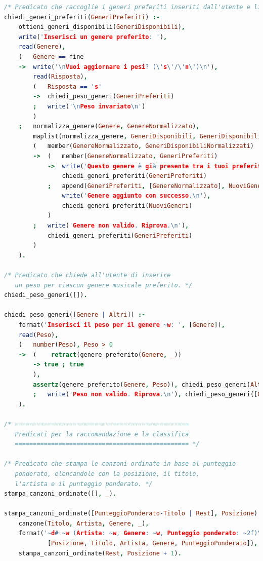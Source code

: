 \documentclass[a4paper,11pt]{article}
\begin{document}
\begin{lstlisting}[language=Prolog]
/* Predicato che raccoglie i generi preferiti inseriti dall'utente e li aggiunge alla lista di preferiti. */
chiedi_generi_preferiti(GeneriPreferiti) :- 
    ottieni_generi_disponibili(GeneriDisponibili),
    write('Inserisci un genere preferito: '),
    read(Genere),
    (   Genere == fine
    ->  write('\nVuoi aggiornare i pesi? (\'s\'/\'n\')\n'),
        read(Risposta),
        (   Risposta == 's'
        ->  chiedi_peso_generi(GeneriPreferiti)
        ;   write('\nPeso invariato\n')
        )
    ;   normalizza_genere(Genere, GenereNormalizzato),
        maplist(normalizza_genere, GeneriDisponibili, GeneriDisponibiliNormalizzati),
        (   member(GenereNormalizzato, GeneriDisponibiliNormalizzati)
        ->  (   member(GenereNormalizzato, GeneriPreferiti)
            ->  write('Questo genere è già presente tra i tuoi preferiti.\n'),
                chiedi_generi_preferiti(GeneriPreferiti)
            ;   append(GeneriPreferiti, [GenereNormalizzato], NuoviGeneri),
                write('Genere aggiunto con successo.\n'),
                chiedi_generi_preferiti(NuoviGeneri)
            )
        ;   write('Genere non valido. Riprova.\n'),
            chiedi_generi_preferiti(GeneriPreferiti)
        )
    ).

/* Predicato che chiede all'utente di inserire
   un peso per ciascun genere musicale preferito. */
chiedi_peso_generi([]).

chiedi_peso_generi([Genere | Altri]) :- 
    format('Inserisci il peso per il genere ~w: ', [Genere]),
    read(Peso),
    (   number(Peso), Peso > 0
    ->  (    retract(genere_preferito(Genere, _))
        -> true ; true
        ),
        assertz(genere_preferito(Genere, Peso)), chiedi_peso_generi(Altri)
        ;   write('Peso non valido. Riprova.\n'), chiedi_peso_generi([Genere | Altri])
    ).
    
/* ================================================
   Predicati per la raccomandazione e la classifica
   ================================================ */

/* Predicato che stampa le canzoni ordinate in base al punteggio
   ponderato, elencandole con la posizione, il titolo,
   l'artista e il punteggio ponderato. */
stampa_canzoni_ordinate([], _).

stampa_canzoni_ordinate([PunteggioPonderato-Titolo | Rest], Posizione) :- 
    canzone(Titolo, Artista, Genere, _),
    format('~d# ~w (Artista: ~w, Genere: ~w, Punteggio ponderato: ~2f)\n', 
            [Posizione, Titolo, Artista, Genere, PunteggioPonderato]),
    stampa_canzoni_ordinate(Rest, Posizione + 1).


\end{lstlisting}
\end{document}
